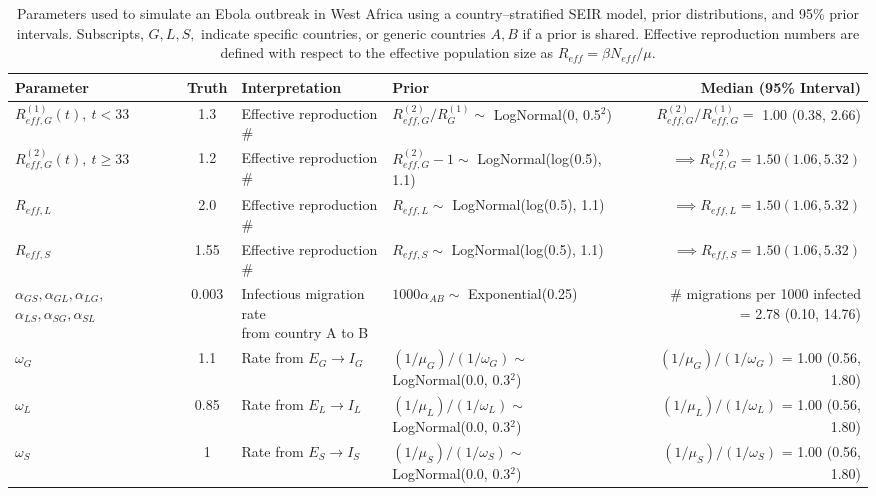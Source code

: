 \begin{table}
	\begin{fullpage}
		\caption[Parameters and priors for a simulated Ebola outbreak in West Africa.]{Parameters used to simulate an Ebola outbreak in West Africa using a country--stratified SEIR model, prior distributions, and 95\% prior intervals. Subscripts, $ G,L,S, $ indicate specific countries, or generic countries $ A,B $ if a prior is shared. Effective reproduction numbers are defined with respect to the effective population size as $ R_{eff} = \beta N_{eff} /\mu $.}
		\label{tab:ebola_synth_pars}
		\scriptsize
	\centering
	\begin{tabular}{lcllr}
		\hline
		\textbf{Parameter} & \textbf{Truth} & \textbf{Interpretation} & \textbf{Prior} & \textbf{Median (95\% Interval)} \\ \hline
		$ R_{eff,G}^{(1)}(t),\ t<33 $ & 1.3 & Effective reproduction \#  & $ R_{eff,G}^{(2)} / R_G^{(1)}\sim $ LogNormal(0, 0.5$ ^2 $) & $ R_{eff,G}^{(2)} / R_{eff,G}^{(1)} = $ 1.00 (0.38, 2.66) \\
		$ R_{eff,G}^{(2)}(t),\ t\geq33 $ & 1.2 & Effective reproduction \# & $ R_{eff,G}^{(2)}-1\sim $ LogNormal(log(0.5), 1.1) & $ \implies R_{eff,G}^{(2)} = 1.50 (1.06, 5.32)$ \\
		$ R_{eff,L} $ & 2.0 & Effective reproduction \# & $ R_{eff,L}\sim $ LogNormal(log(0.5), 1.1) & $ \implies R_{eff,L} = 1.50 (1.06, 5.32)$ \\
		$ R_{eff,S} $ & 1.55 & Effective reproduction \# & $ R_{eff,S}\sim $ LogNormal(log(0.5), 1.1) & $ \implies R_{eff,S} = 1.50 (1.06, 5.32)$ \\
		\makecell[l]{$ \alpha_{GS},\alpha_{GL}, \alpha_{LG},$\\
		$ \alpha_{LS},\alpha_{SG}, \alpha_{SL} $} & 0.003 & \makecell[l]{Infectious migration rate \\ from country A to B} & $ 1000\alpha_{AB} \sim$ Exponential(0.25) & \makecell[r]{\# migrations per 1000 infected \\ = 2.78 (0.10, 14.76)}\\ 
		$ \omega_G $ & 1.1 & Rate from $ E_G\rightarrow I_G $ & $ (1/\mu_G)\big/(1/\omega_G) \sim $ LogNormal(0.0, 0.3$ ^2 $) & $ (1/\mu_G)\big/(1/\omega_G) $ = 1.00 (0.56, 1.80) \\
		$ \omega_L $ & 0.85 & Rate from $ E_L\rightarrow I_L $ & $ (1/\mu_L)\big/(1/\omega_L) \sim $ LogNormal(0.0, 0.3$ ^2 $) & $ (1/\mu_L)\big/(1/\omega_L) $ = 1.00 (0.56, 1.80) \\
		$ \omega_S $ & 1 & Rate from $ E_S\rightarrow I_S $ & $ (1/\mu_S)\big/(1/\omega_S) \sim $ LogNormal(0.0, 0.3$ ^2 $) & $ (1/\mu_S)\big/(1/\omega_S) $ = 1.00 (0.56, 1.80) \\

\end{tabular}
\end{fullpage}
\end{table}
